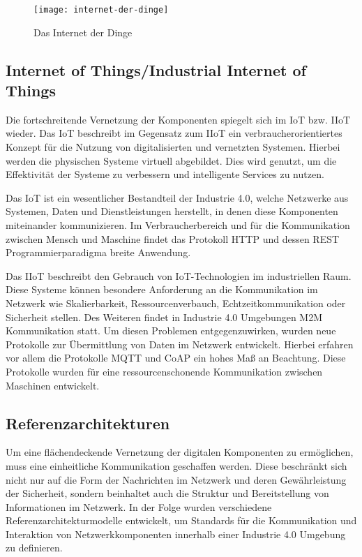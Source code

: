 \begin{figure}[h]
  \centering
  \texttt{[image: internet-der-dinge]}
  \caption{Das Internet der Dinge}
  \label{Grundlagen:Das Internet der Dinge}
\end{figure}

\subsection{Internet of Things/Industrial Internet of Things}
\label{Grundlagen:IoT/IIoT}
Die fortschreitende Vernetzung der Komponenten spiegelt sich im \ac{IoT} bzw. \ac{IIoT} wieder. Das \ac{IoT} beschreibt im Gegensatz zum \ac{IIoT} ein verbraucherorientiertes Konzept für die Nutzung von digitalisierten und vernetzten Systemen. Hierbei werden die physischen Systeme virtuell abgebildet. Dies wird genutzt, um die Effektivität der Systeme zu verbessern und intelligente Services zu nutzen.

Das \ac{IoT} ist ein wesentlicher Bestandteil der Industrie 4.0, welche Netzwerke aus Systemen, Daten und Dienstleistungen herstellt, in denen diese Komponenten miteinander kommunizieren. Im Verbraucherbereich und für die Kommunikation zwischen Mensch und Maschine findet das Protokoll \ac{HTTP} und dessen \ac{REST} Programmierparadigma breite Anwendung. 

Das \ac{IIoT} beschreibt den Gebrauch von \ac{IoT}-Technologien im industriellen Raum. Diese Systeme können besondere Anforderung an die Kommunikation im Netzwerk wie Skalierbarkeit, Ressourcenverbauch, Echtzeitkommunikation oder Sicherheit stellen. Des Weiteren findet in Industrie 4.0 Umgebungen \ac{M2M} Kommunikation statt. Um diesen Problemen entgegenzuwirken, wurden neue Protokolle zur Übermittlung von Daten im Netzwerk entwickelt. Hierbei erfahren vor allem die Protokolle \ac{MQTT} und \ac{CoAP} ein hohes Maß an Beachtung. Diese Protokolle wurden für eine ressourcenschonende Kommunikation zwischen Maschinen entwickelt.

\subsection{Referenzarchitekturen}
Um eine flächendeckende Vernetzung der digitalen Komponenten zu ermöglichen, muss eine einheitliche Kommunikation geschaffen werden. Diese beschränkt sich nicht nur auf die Form der Nachrichten im Netzwerk und deren Gewährleistung der Sicherheit, sondern beinhaltet auch die Struktur und Bereitstellung von Informationen im Netzwerk. In der Folge wurden verschiedene Referenzarchitekturmodelle entwickelt, um Standards für die Kommunikation und Interaktion von Netzwerkkomponenten innerhalb einer Industrie 4.0 Umgebung zu definieren.


